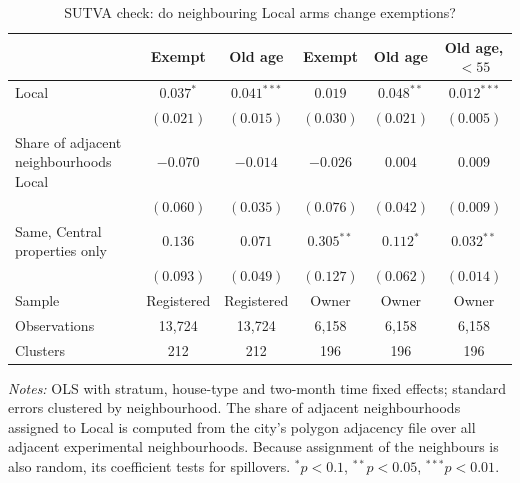 \begin{table}[!htbp]\centering\footnotesize
\caption{SUTVA check: do neighbouring Local arms change exemptions?}\label{tab:spill}
\begin{threeparttable}
\begin{tabular}{lccccc}
\toprule
 & Exempt & Old age & Exempt & Old age & Old age, $<55$ \\
\midrule
Local & $0.037^{*}$ & $0.041^{***}$ & $0.019$ & $0.048^{**}$ & $0.012^{***}$ \\
 & $(0.021)$ & $(0.015)$ & $(0.030)$ & $(0.021)$ & $(0.005)$ \\
Share of adjacent neighbourhoods Local & $-0.070$ & $-0.014$ & $-0.026$ & $0.004$ & $0.009$ \\
 & $(0.060)$ & $(0.035)$ & $(0.076)$ & $(0.042)$ & $(0.009)$ \\
\midrule
Same, Central properties only & $0.136$ & $0.071$ & $0.305^{**}$ & $0.112^{*}$ & $0.032^{**}$ \\
 & $(0.093)$ & $(0.049)$ & $(0.127)$ & $(0.062)$ & $(0.014)$ \\
\midrule
Sample & Registered & Registered & Owner & Owner & Owner \\
Observations & 13,724 & 13,724 & 6,158 & 6,158 & 6,158 \\
Clusters & 212 & 212 & 196 & 196 & 196 \\
\bottomrule
\end{tabular}
\begin{tablenotes}[flushleft]\scriptsize
\item \textit{Notes:} OLS with stratum, house-type and two-month time fixed effects; standard errors clustered by neighbourhood. The share of adjacent neighbourhoods assigned to Local is computed from the city's polygon adjacency file over all adjacent experimental neighbourhoods. Because assignment of the neighbours is also random, its coefficient tests for spillovers. $^{*}p<0.1$, $^{**}p<0.05$, $^{***}p<0.01$.
\end{tablenotes}
\end{threeparttable}
\end{table}